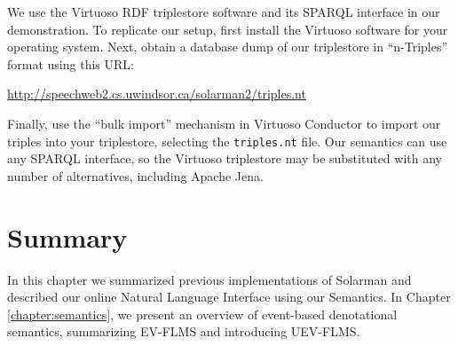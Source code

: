 \documentclass[../main.tex]{subfiles}
\begin{document}
We use the Virtuoso RDF triplestore software and its SPARQL interface\cite{virtuoso} in our demonstration.  To replicate our setup,
first install the Virtuoso software for your operating system.  Next, obtain a database dump of our triplestore
in ``n-Triples'' format\cite{w3cntriples} using this URL:

\url{http://speechweb2.cs.uwindsor.ca/solarman2/triples.nt}

Finally, use the ``bulk import'' mechanism in Virtuoso Conductor to import our triples into your triplestore, selecting the \texttt{triples.nt} file.
Our semantics can use any SPARQL interface, so the Virtuoso triplestore may be substituted with any number of alternatives, including Apache Jena\cite{jena2013apache}.

\section{Summary}

In this chapter we summarized previous implementations of Solarman and described our online Natural Language Interface using our Semantics.
In Chapter \ref{chapter:semantics}, we present an overview of event-based denotational semantics, summarizing EV-FLMS and introducing UEV-FLMS.
\end{document}

